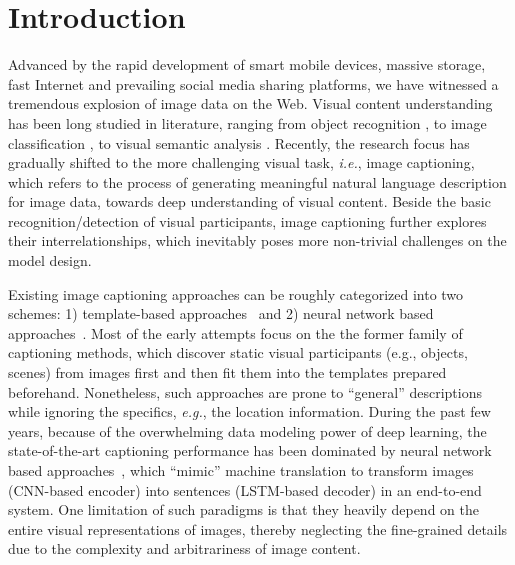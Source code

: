 \documentclass[10pt,twocolumn,letterpaper]{article}
\begin{document}
	\section{Introduction}
	Advanced by the rapid development of smart mobile devices, massive storage, fast Internet and prevailing social media sharing platforms, we have witnessed a tremendous explosion of image data on the Web. Visual content understanding has been long studied in literature, ranging from object recognition \cite{he2015deep,liang2015recurrent,dai2016r}, to image classification \cite{he2015deep,krizhevsky2012imagenet}, to visual semantic analysis \cite{yang2014exploiting,yang2015visual,zhang2014start,hong2015learning,bin2016bidirectional}. Recently, the research focus has gradually shifted to the more challenging visual task, \emph{i.e.}, image captioning, which refers to the process of generating meaningful natural language description for image data, towards deep understanding of visual content. Beside the basic recognition/detection of visual participants, image captioning further explores their interrelationships, which inevitably poses more non-trivial challenges on the model design.
	
	Existing image captioning approaches can be roughly categorized into two schemes: 1) template-based approaches~\cite{kulkarni2013babytalk} and 2) neural network based approaches~\cite{karpathy2014deep}. Most of the early attempts focus on the the former family of captioning methods, which discover static visual participants (e.g., objects, scenes) from images first and then fit them into the templates prepared beforehand. Nonetheless, such approaches are prone to ``general'' descriptions while ignoring the specifics, \emph{e.g.}, the location information. During the past few years, because of the overwhelming data modeling power of deep learning, the state-of-the-art captioning performance has been dominated by neural network based approaches~\cite{chen2015mind,donahue2015long,mao2015learning}, which ``mimic'' machine translation to transform images (CNN-based encoder) into sentences (LSTM-based decoder) in an end-to-end system. One limitation of such paradigms is that they heavily depend on the entire visual representations of images, thereby neglecting the fine-grained details due to the complexity and arbitrariness of image content.
	
\end{document}
